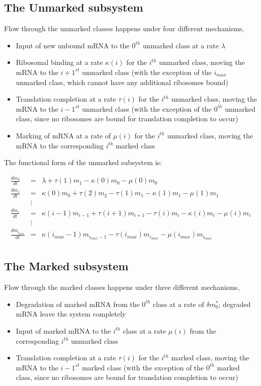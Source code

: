 \documentclass[review]{elsarticle}
\begin{document}
\subsection{The Unmarked subsystem}
Flow through the unmarked classes happens under four different mechanisms,
\begin{itemize}
\item Input of new unbound mRNA to the $0^{th}$ unmarked class at a rate $\lambda$
\item Ribosomal binding at a rate $\kappa(i)$ for the $i^{th}$ unmarked class, moving the mRNA to the $i+1^{st}$ unmarked class (with the exception of the $i_{max}$ unmarked class, which cannot have any additional ribosomes bound)
\item Translation completion at a rate $\tau(i)$ for the $i^{th}$ unmarked class, moving the mRNA to the $i-1^{st}$ unmarked class (with the exception of the $0^{th}$ unmarked class, since no ribosomes are bound for translation completion to occur)
\item Marking of mRNA at a rate of $\mu(i)$ for the $i^{th}$ unmarked class, moving the mRNA to the corresponding $i^{th}$ marked class
\end{itemize}

The functional form of the unmarked subsystem is:

\begin{eqnarray*}
\frac{dm_{0}}{dt} & = & \lambda+\tau(1)m_{1}-\kappa(0)m_{0}-\mu(0)m_{0} \\
\frac{dm_{1}}{dt} & = & \kappa(0)m_{0}+\tau(2)m_{2}-\tau(1)m_{1}-\kappa(1)m_{1}-\mu(1)m_{1}\\
& \vdots & \\
\frac{dm_{i}}{dt} & = & \kappa(i-1)m_{i-1}+\tau(i+1)m_{i+1}-\tau(i)m_{i}-\kappa(i)m_{i}-\mu(i)m_{i} \\
& \vdots & \\
\frac{dm_{i_{max}}}{dt} & = & \kappa(i_{max}-1)m_{i_{max}-1}-\tau(i_{max})m_{i_{max}}-\mu(i_{max})m_{i_{max}} \\
\end{eqnarray*}

\subsection{The Marked subsystem}
Flow through the marked classes happens under three different mechanisms,
\begin{itemize}
\item Degradation of marked mRNA from the $0^{th}$ class at a rate of $\delta m^*_0$; degraded mRNA leave the system completely
\item Input of marked mRNA to the $i^{th}$ class at a rate $\mu(i)$ from the corresponding $i^{th}$ unmarked class
\item Translation completion at a rate $\tau(i)$ for the $i^{th}$ marked class, moving the mRNA to the $i-1^{st}$ marked class (with the exception of the $0^{th}$ marked class, since no ribosomes are bound for translation completion to occur)
\end{itemize}
\end{document}
